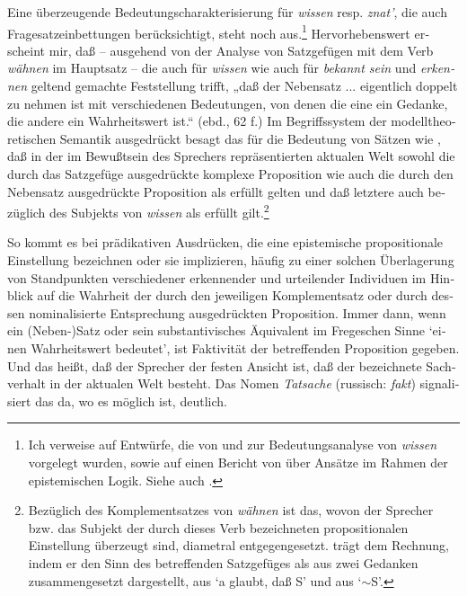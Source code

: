 \documentclass[output=paper]{langscibook}
\begin{document}
\begin{otherlanguage}{german}
\noindent Eine überzeugende Bedeutungscharakterisierung für \textit{wissen} resp. \textit{znat’}, die auch Fragesatzeinbettungen berücksichtigt, steht noch aus.\footnote{Ich verweise auf Entwürfe, die von \citet[277 f.]{reichenbach1966elements-of-symbolic-logic} und \citet{vendler1980telling-the-facts} zur Bedeutungsanalyse von \textit{wissen} vorgelegt wurden, sowie auf einen Bericht von \citet{wuttich1976epistemische-logik} über Ansätze im Rahmen der epistemischen Logik. Siehe auch \citet{zybatow1983syntaktische-und-semantische-eigenschaften-der-komplementsatze-kognitiver-verben-des-modernen-russischen}.} Hervorhebenswert erscheint mir, daß \citet{frege1892uber-sinn-und-bedeutung} -- ausgehend von der Analyse von Satzgefügen mit dem Verb \textit{wähnen} im Hauptsatz -- die auch für \textit{wissen} wie auch für \textit{bekannt sein} und \textit{erkennen} geltend gemachte Feststellung trifft, „daß der Nebensatz ... eigentlich doppelt zu nehmen ist mit verschiedenen Bedeutungen, von denen die eine ein Gedanke, die andere ein Wahrheitswert ist.“ (ebd., 62 f.) Im Begriffssystem der modelltheoretischen Semantik ausgedrückt besagt das für die Bedeutung von Sätzen wie , daß in der im Bewußtsein des Sprechers repräsentierten aktualen Welt sowohl die durch das Satzgefüge ausgedrückte komplexe Proposition wie auch die durch den Nebensatz ausgedrückte Proposition als erfüllt gelten und daß letztere auch bezüglich des Subjekts von \textit{wissen} als erfüllt gilt.\footnote{Bezüglich des Komplementsatzes von \textit{wähnen} ist das, wovon der Sprecher bzw. das Subjekt der durch dieses Verb bezeichneten propositionalen Einstellung überzeugt sind, diametral entgegengesetzt. \citet[62]{frege1892uber-sinn-und-bedeutung} trägt dem Rechnung, indem er den Sinn des betreffenden Satzgefüges als aus zwei Gedanken zusammengesetzt dargestellt, aus ‘a glaubt, daß S’ und aus ‘$\sim$S’.}

So kommt es bei prädikativen Ausdrücken, die eine epistemische propositionale Einstellung bezeichnen oder sie implizieren, häufig zu einer solchen Über\-la\-ge\-rung von Standpunkten verschiedener erkennender und urteilender Individuen im Hinblick auf die Wahrheit der durch den jeweiligen Komplementsatz oder durch dessen nominalisierte Entsprechung ausgedrückten Proposition. Immer dann, wenn ein (Neben-)Satz oder sein substantivisches Äquivalent im Fre\-ge\-schen %
Sinne ‘einen Wahrheitswert bedeutet’, ist Faktivität der betreffenden Proposition gegeben. Und das heißt, daß der Sprecher der festen Ansicht ist, daß der bezeichnete Sachverhalt in der aktualen Welt besteht. Das Nomen \textit{Tatsache} (russisch: \textit{fakt}) signalisiert das da, wo es möglich ist, deutlich.


\end{otherlanguage}
\end{document}
